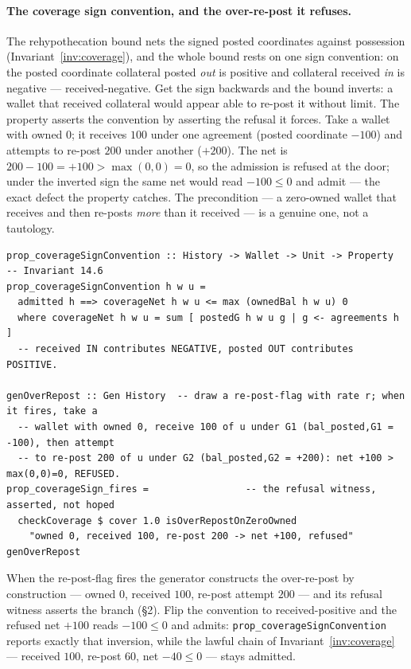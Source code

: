 \paragraph{The coverage sign convention, and the over-re-post it refuses.}
The rehypothecation bound nets the signed posted coordinates against possession
(Invariant~\ref{inv:coverage}), and the whole bound rests on one sign convention: on
the posted coordinate collateral posted \emph{out} is positive and collateral
received \emph{in} is negative --- received-negative. Get the sign backwards and the
bound inverts: a wallet that received collateral would appear able to re-post it
without limit. The property asserts the convention by asserting the refusal it
forces. Take a wallet with owned $0$; it receives $100$ under one agreement (posted
coordinate $-100$) and attempts to re-post $200$ under another ($+200$). The net is
$200-100=+100>\max(0,0)=0$, so the admission is refused at the door; under the
inverted sign the same net would read $-100\le 0$ and admit --- the exact defect the
property catches. The precondition --- a zero-owned wallet that receives and then
re-posts \emph{more} than it received --- is a genuine one, not a tautology.

\begin{lstlisting}
prop_coverageSignConvention :: History -> Wallet -> Unit -> Property  -- Invariant 14.6
prop_coverageSignConvention h w u =
  admitted h ==> coverageNet h w u <= max (ownedBal h w u) 0
  where coverageNet h w u = sum [ postedG h w u g | g <- agreements h ]
  -- received IN contributes NEGATIVE, posted OUT contributes POSITIVE.

genOverRepost :: Gen History  -- draw a re-post-flag with rate r; when it fires, take a
  -- wallet with owned 0, receive 100 of u under G1 (bal_posted,G1 = -100), then attempt
  -- to re-post 200 of u under G2 (bal_posted,G2 = +200): net +100 > max(0,0)=0, REFUSED.
prop_coverageSign_fires =                 -- the refusal witness, asserted, not hoped
  checkCoverage $ cover 1.0 isOverRepostOnZeroOwned
    "owned 0, received 100, re-post 200 -> net +100, refused" genOverRepost
\end{lstlisting}

When the re-post-flag fires the generator constructs the over-re-post by construction
--- owned $0$, received $100$, re-post attempt $200$ --- and its refusal witness asserts
the branch (\S 2). Flip the convention to received-positive and the refused net $+100$ reads
$-100 \le 0$ and admits: \texttt{prop\_coverageSignConvention} reports exactly that
inversion, while the lawful chain of Invariant~\ref{inv:coverage} --- received $100$,
re-post $60$, net $-40 \le 0$ --- stays admitted.

